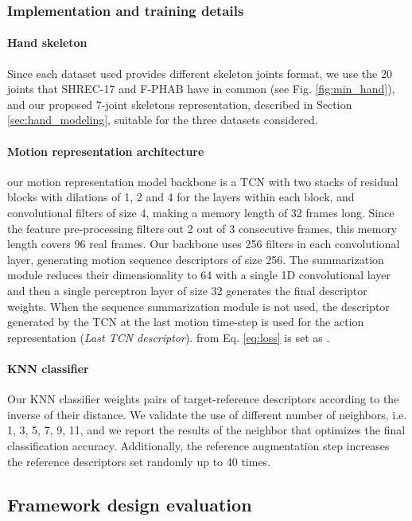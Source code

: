 \documentclass[letterpaper, 10 pt, conference]{ieeeconf}
\begin{document}
\subsubsection{Implementation and training details}
\paragraph*{Hand skeleton}
Since each dataset used provides different skeleton joints format, we use the 20 joints that SHREC-17 and F-PHAB have in common (see Fig. \ref{fig:min_hand}), and our proposed 7-joint skeletons representation, described in Section \ref{sec:hand_modeling}, suitable for the three datasets considered.

\paragraph*{Motion representation architecture}
our motion representation model backbone is a TCN with two stacks of residual blocks with dilations of 1, 2 and 4 for the layers within each block,
and convolutional filters of size 4, making a memory length of 32 frames long. Since the feature pre-processing filters out 2 out of 3 consecutive frames, this memory length covers 96 real frames.
Our backbone uses 256 filters in each convolutional layer, generating motion sequence descriptors of size 256. The summarization module reduces their dimensionality to 64 with a single 1D convolutional layer and then a single perceptron layer of size 32 generates the final descriptor weights. 
When the sequence summarization module is not used, the descriptor generated by the TCN at the last motion time-step is used for the action representation (\textit{Last TCN descriptor}). 
 from Eq. \ref{eq:loss} is set as .

\paragraph*{KNN classifier}
Our KNN classifier weights pairs of target-reference descriptors according to the inverse of their distance.
We validate the use of different number of neighbors,  i.e. 1, 3, 5, 7, 9, 11, and we report the results of the neighbor that optimizes the final classification accuracy. Additionally, the reference augmentation step increases the reference descriptors set randomly up to 40 times.




\subsection{Framework design evaluation}
\end{document}
